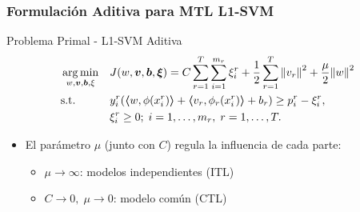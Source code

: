 \documentclass[aspectratio=43]{beamer}
\DeclareMathOperator*{\argmin}{arg\min}
\newcommand{\norm}[1]{\left\lVert#1\right\rVert}
\newcommand{\myvec}[1]{\bm{#1}}
\newcommand{\fv}[1]{\myvec{#1}}
\newcommand{\dotp}[2]{\bm{\left\langle} #1, #2 \bm{\right\rangle}}
\begin{document}
\begin{frame}
      \frametitle{Formulación Aditiva para MTL L1-SVM}
  
      \begin{block}{Problema Primal - L1-SVM Aditiva}
          \begin{equation}\nonumber
              \begin{aligned}
              & \argmin_{w, \fv{v}, \fv{b}, \xi}
              & & {J({w}, \fv{v}, \fv{b}, \fv{\xi}) = C \sum_{r= 1}^T \sum_{i=1}^{m_r} {\xi_{i}^r} + \frac{1}{2} \sum_{r= 1}^T{\norm{{v}_r}^2} + \frac{\mu}{2} {\norm{{w}}}^2} \\
              & \text{s.t.}
              & & y_{i}^r (\dotp{w}{\phi(x_{i}^r)} + \dotp{v_r}{\phi_r(x_{i}^r)} + b_r) \geq p_{i}^r - \xi_{i}^r ,  \\
              & & & \xi_{i}^r \geq 0; \;  i=1 , \dotsc , m_r, \;  r= 1,\dotsc, T  . \\
              \end{aligned}
          \end{equation}   
      \end{block}
      \begin{itemize}
          \item El parámetro $\mu$ (junto con $C$) regula la influencia de cada parte:
          \begin{itemize}
              \item $\mu \to \infty$: modelos independientes (ITL)
              \item $C \to 0,\; \mu \to 0$: modelo común (CTL)
          \end{itemize}
      \end{itemize}
  \end{frame}
  
  
    
\end{document}
